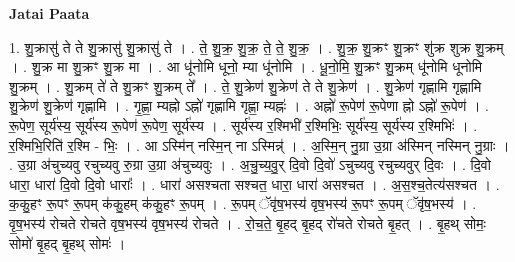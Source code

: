 \documentclass[17pt]{extarticle}
\begin{document}
\textbf{Jatai Paata} \newline

1. शु॒क्रासु॑ ते ते शु॒क्रासु॑ शु॒क्रासु॑ ते । . ते॒ शु॒क्र॒ शु॒क्र॒ ते॒ ते॒ शु॒क्र॒ । . शु॒क्र॒ शु॒क्रꣳ शु॒क्रꣳ शु॑क्र शुक्र शु॒क्रम् । . शु॒क्र मा शु॒क्रꣳ शु॒क्र मा । . आ धू॑नोमि धूनो॒ म्या धू॑नोमि । . धू॒नो॒मि॒ शु॒क्रꣳ शु॒क्रम् धू॑नोमि धूनोमि शु॒क्रम् । . शु॒क्रम् ते॑ ते शु॒क्रꣳ शु॒क्रम् ते᳚ । . ते॒ शु॒क्रेण॑ शु॒क्रेण॑ ते ते शु॒क्रेण॑ । . शु॒क्रेण॑ गृह्णामि गृह्णामि शु॒क्रेण॑ शु॒क्रेण॑ गृह्णामि । . गृ॒ह्णा॒ म्यह्नो ऽह्नो॑ गृह्णामि गृह्णा॒ म्यह्नः॑ । . अह्नो॑ रू॒पेण॑ रू॒पेणा ह्नो ऽह्नो॑ रू॒पेण॑ । . रू॒पेण॒ सूर्य॑स्य॒ सूर्य॑स्य रू॒पेण॑ रू॒पेण॒ सूर्य॑स्य । . सूर्य॑स्य र॒श्मिभी॑ र॒श्मिभिः॒ सूर्य॑स्य॒ सूर्य॑स्य र॒श्मिभिः॑ । . र॒श्मिभि॒रिति॑ र॒श्मि - भिः॒ । . आ ऽस्मि॑न् नस्मि॒न् ना ऽस्मिन्न्॑ । . अ॒स्मि॒न् नु॒ग्रा उ॒ग्रा अ॑स्मिन् नस्मिन् नु॒ग्राः । . उ॒ग्रा अ॑चुच्यवु रचुच्यवु रु॒ग्रा उ॒ग्रा अ॑चुच्यवुः । . अ॒चु॒च्य॒वु॒र् दि॒वो दि॒वो॑ ऽचुच्यवु रचुच्यवुर् दि॒वः । . दि॒वो धारा॒ धारा॑ दि॒वो दि॒वो धाराः᳚ । . धारा॑ असश्चता सश्चत॒ धारा॒ धारा॑ असश्चत । . अ॒स॒श्च॒तेत्य॑सश्चत । . क॒कु॒हꣳ रू॒पꣳ रू॒पम् क॑कु॒हम् क॑कु॒हꣳ रू॒पम् । . रू॒पम् ॅवृ॑ष॒भस्य॑ वृष॒भस्य॑ रू॒पꣳ रू॒पम् ॅवृ॑ष॒भस्य॑ । . वृ॒ष॒भस्य॑ रोचते रोचते वृष॒भस्य॑ वृष॒भस्य॑ रोचते । . रो॒च॒ते॒ बृ॒हद् बृ॒हद् रो॑चते रोचते बृ॒हत् । . बृ॒हथ् सोमः॒ सोमो॑ बृ॒हद् बृ॒हथ् सोमः॑ । \newline
\end{document}
